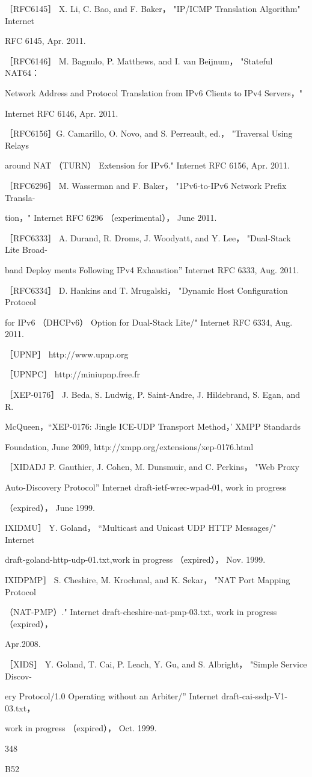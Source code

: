 ［RFC6145］ X. Li, C. Bao, and F. Baker， "IP/ICMP Translation Algorithm" Internet

RFC 6145, Apr. 2011.

［RFC6146］ M. Bagnulo, P. Matthews, and I. van Beijnum， "Stateful NAT64：

Network Address and Protocol Translation from IPv6 Clients to IPv4 Servers，"

Internet RFC 6146, Apr. 2011.

［RFC6156］G. Camarillo, O. Novo, and S. Perreault, ed.， "Traversal Using Relays

around NAT （TURN） Extension for IPv6." Internet RFC 6156, Apr. 2011.

［RFC6296］ M. Wasserman and F. Baker， "1Pv6-to-IPv6 Network Prefix Transla-

tion，" Internet RFC 6296 （experimental）， June 2011.

［RFC6333］ A. Durand, R. Droms, J. Woodyatt, and Y. Lee， "Dual-Stack Lite Broad-

band Deploy ments Following IPv4 Exhaustion” Internet RFC 6333, Aug. 2011.

［RFC6334］ D. Hankins and T. Mrugalski， "Dynamic Host Configuration Protocol

for IPv6 （DHCPv6） Option for Dual-Stack Lite/" Internet RFC 6334, Aug. 2011.

［UPNP］ http://www.upnp.org

［UPNPC］ http://miniupnp.free.fr

［XEP-0176］ J. Beda, S. Ludwig, P. Saint-Andre, J. Hildebrand, S. Egan, and R.

McQueen，“XEP-0176: Jingle ICE-UDP Transport Method，' XMPP Standards

Foundation, June 2009, http://xmpp.org/extensions/xep-0176.html

［XIDADJ P. Gauthier, J. Cohen, M. Dunsmuir, and C. Perkins， "Web Proxy

Auto-Discovery Protocol” Internet draft-ietf-wrec-wpad-01, work in progress

（expired）， June 1999.

IXIDMU］ Y. Goland， “Multicast and Unicast UDP HTTP Messages/" Internet

draft-goland-http-udp-01.txt,work in progress （expired）， Nov. 1999.

IXIDPMP］ S. Cheshire, M. Krochmal, and K. Sekar， "NAT Port Mapping Protocol

（NAT-PMP）." Internet draft-cheshire-nat-pmp-03.txt, work in progress （expired），

Apr.2008.

［XIDS］ Y. Goland, T. Cai, P. Leach, Y. Gu, and S. Albright， "Simple Service Discov-

ery Protocol/1.0 Operating without an Arbiter/” Internet draft-cai-ssdp-V1-03.txt，

work in progress （expired）， Oct. 1999.

348

B52